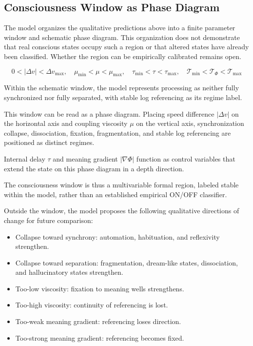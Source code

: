 \subsection{Consciousness Window as Phase Diagram}


The model organizes the qualitative predictions above into a finite parameter window and schematic phase diagram. This organization does not demonstrate that real conscious states occupy such a region or that altered states have already been classified. Whether the region can be empirically calibrated remains open.

\begin{equation}
0 < |\Delta v| < \Delta v_{\max}, \quad \mu_{\min} < \mu < \mu_{\max}, \quad \tau_{\min} < \tau < \tau_{\max}, \quad \mathcal{T}_{\min} < \mathcal{T}_{\Phi} < \mathcal{T}_{\max}
\end{equation}

Within the schematic window, the model represents processing as neither fully synchronized nor fully separated, with stable log referencing as its regime label.

This window can be read as a phase diagram. Placing speed difference $|\Delta v|$ on the horizontal axis and coupling viscosity $\mu$ on the vertical axis, synchronization collapse, dissociation, fixation, fragmentation, and stable log referencing are positioned as distinct regimes.

Internal delay $\tau$ and meaning gradient $|\nabla\Phi|$ function as control variables that extend the state on this phase diagram in a depth direction.

The consciousness window is thus a multivariable formal region, labeled stable within the model, rather than an established empirical ON/OFF classifier.

Outside the window, the model proposes the following qualitative directions of change for future comparison:

\begin{itemize}
\item Collapse toward synchrony: automation, habituation, and reflexivity strengthen.
\item Collapse toward separation: fragmentation, dream-like states, dissociation, and hallucinatory states strengthen.
\item Too-low viscosity: fixation to meaning wells strengthens.
\item Too-high viscosity: continuity of referencing is lost.
\item Too-weak meaning gradient: referencing loses direction.
\item Too-strong meaning gradient: referencing becomes fixed.
\end{itemize}

